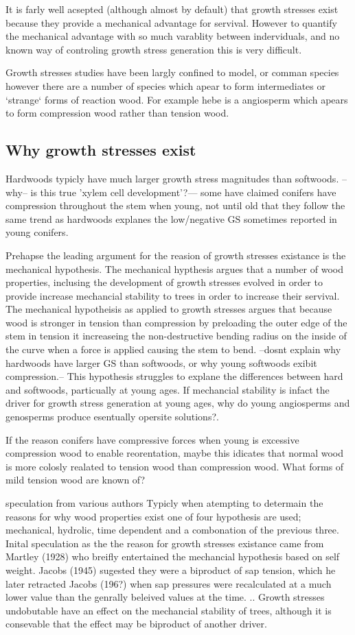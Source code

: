\documentclass{article}
\begin{document}
It is farly well acsepted (although almost by default) that growth stresses
exist because they provide a mechanical advantage for servival. However to
quantify the mechanical advantage with so much varablity between inderviduals,
and no known way of controling growth stress generation this is very difficult.

Growth stresses studies have been largly confined to model, or comman species
however there are a number of species which apear to form intermediates or
`strange` forms of reaction wood. For example hebe is a angiosperm which apears
to form compression wood rather than tension wood.

\subsection{Why growth stresses exist}
Hardwoods typicly have much larger growth stress magnitudes than softwoods.
--why-- is this true 'xylem cell development'?--- some have claimed conifers
have compression throughout the stem when young, not until old that they follow
the same trend as hardwoods explanes the low/negative GS sometimes reported in
young conifers.

Prehapse the leading argument for the reasion of growth stresses existance is
the mechanical hypothesis. The mechanical hypthesis argues that a number of wood
properties, inclusing the development of growth stresses evolved in order to
provide increase mechancial stability to trees in order to increase their
servival. The mechanical hypotheisis as applied to growth stresses argues that
because wood is stronger in tension than compression by preloading the outer
edge of the stem in tension it increaseing the non-destructive bending radius on
the inside of the curve when a force is applied causing the stem to bend.
--dosnt explain why hardwoods have larger GS than softwoods, or why young
softwoods exibit compression.-- This hypothesis struggles to explane the
differences between hard and softwoods, particually at young ages. If mechancial
stability is infact the driver for growth stress generation at young ages, why
do young angiosperms and genosperms produce esentually opersite solutions?.

If the reason conifers have compressive forces when young is excessive
compression wood to enable reorentation, maybe this idicates that normal wood is
more colosly realated to tension wood than compression wood. What forms of mild
tension wood are known of?

speculation from various authors
Typicly when atempting to determain the reasons for why wood properties exist
one of four hypothesis are used; mechanical, hydrolic, time dependent and a
combonation of the previous three. Inital speculation as the the reason for
growth stresses existance came from Martley (1928) who breifly entertained the
mechancial hypothesis based on self weight. Jacobs (1945) sugested they were a
biproduct of sap tension, which he later retracted Jacobs (196?) when sap
pressures were recalculated at a much lower value than the genrally beleived
values at the time. .. Growth stresses undobutable have an effect on the
mechancial stability of trees, although it is consevable that the effect may be
biproduct of another driver.
\end{document}
